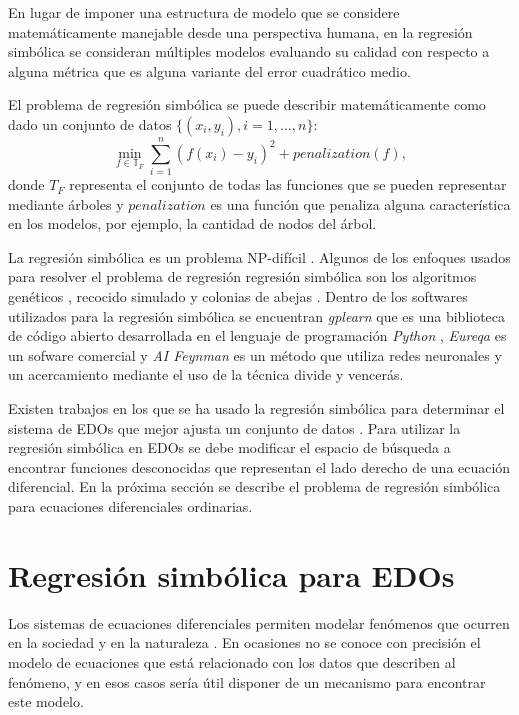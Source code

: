 En lugar de imponer una estructura de modelo que se considere matemáticamente manejable desde una perspectiva humana, en la regresión simbólica se consideran múltiples modelos evaluando su calidad con respecto a alguna métrica que es alguna variante del error cuadrático medio.

El problema de regresión simbólica se puede describir matemáticamente como dado un conjunto de datos $\{(x_i, y_i), i = 1, \dots, n\}$:
$$\min_{f\in\mathbb{T}_F} \sum_{i=1}^n (f(x_i) - y_i)^2 + penalization(f),$$
donde $T_F$ representa el conjunto de todas las funciones que se pueden representar mediante árboles y $penalization$ es una función que penaliza alguna característica en los modelos, por ejemplo, la cantidad de nodos del árbol.

La regresión simbólica  es un problema NP-difícil \cite{virgolin2022symbolic}. Algunos de los enfoques usados para resolver el problema de regresión regresión simbólica son los algoritmos genéticos \cite{koza1994genetic, schmidt2013eureqa, gaucel2014learning}, recocido simulado \cite{turing_bot} y colonias de abejas \cite{multihive,karaboga2010artificial}. Dentro de los softwares utilizados para la regresión simbólica se encuentran \textit{gplearn} que es una biblioteca de código abierto desarrollada en el lenguaje de programación \textit{Python} \cite{gplearn}, \textit{Eureqa} es un sofware  comercial \cite{schmidt2013eureqa} y \textit{AI Feynman} es un método que utiliza redes neuronales y un acercamiento mediante el uso de la técnica divide y vencerás\cite{udrescu2020ai}.

Existen trabajos en los que se ha usado la regresión simbólica para determinar el sistema de EDOs que mejor ajusta un conjunto de datos \cite{koza1994genetic, iba2008inference, gaucel2014learning, kronberger2019identification}. Para utilizar la regresión simbólica en EDOs se debe modificar el espacio de búsqueda a encontrar funciones desconocidas que representan el lado derecho de una ecuación diferencial. En la próxima sección se describe el problema de regresión simbólica para ecuaciones diferenciales ordinarias.

\section{Regresión simbólica para EDOs}\label{section:symbolic_regression_in_does}

Los sistemas de ecuaciones diferenciales permiten modelar fenómenos que ocurren en la sociedad y en la naturaleza \cite{weiss2013sir, udrescu2020ai, kuddus2021mathematical}. En ocasiones no se conoce con precisión el modelo de ecuaciones que está relacionado con los datos que describen al fenómeno, y en esos casos sería útil disponer de un mecanismo para encontrar este modelo.

